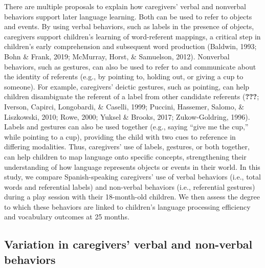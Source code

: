 \documentclass[
  english,
  man,floatsintext]{apa6}
\begin{document}
There are multiple proposals to explain how caregivers' verbal and nonverbal behaviors support later language learning. Both can be used to refer to objects and events. By using verbal behaviors, such as labels in the presence of objects, caregivers support children's learning of word-referent mappings, a critical step in children's early comprehension and subsequent word production (Baldwin, 1993; Bohn \& Frank, 2019; McMurray, Horst, \& Samuelson, 2012). Nonverbal behaviors, such as gestures, can also be used to refer to and communicate about the identity of referents (e.g., by pointing to, holding out, or giving a cup to someone). For example, caregivers' deictic gestures, such as pointing, can help children disambiguate the referent of a label from other candidate referents ({\textbf{???}}; Iverson, Capirci, Longobardi, \& Caselli, 1999; Puccini, Hassemer, Salomo, \& Liszkowski, 2010; Rowe, 2000; Yuksel \& Brooks, 2017; Zukow-Goldring, 1996). Labels and gestures can also be used together (e.g., saying \enquote{give me the cup,} while pointing to a cup), providing the child with two cues to reference in differing modalities. Thus, caregivers' use of labels, gestures, or both together, can help children to map language onto specific concepts, strengthening their understanding of how language represents objects or events in their world. In this study, we compare Spanish-speaking caregivers' use of verbal behaviors (i.e., total words and referential labels) and non-verbal behaviors (i.e., referential gestures) during a play session with their 18-month-old children. We then assess the degree to which these behaviors are linked to children's language processing efficiency and vocabulary outcomes at 25 months.

\hypertarget{variation-in-caregivers-verbal-and-non-verbal-behaviors}{%
\subsection{Variation in caregivers' verbal and non-verbal behaviors}\label{variation-in-caregivers-verbal-and-non-verbal-behaviors}}
\end{document}
